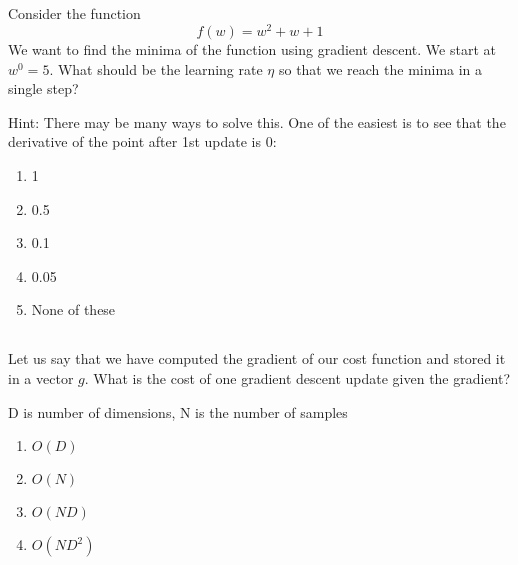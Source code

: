 \begin{frame}
\section{}
Consider the function
\[f(w) = w^2 + w + 1\]
We want to find the minima of the function using gradient descent. We start at $w^0=5$. What should be the learning rate $\eta$ so that we reach the minima in a single step?

Hint: There may be many ways to solve this. One of the easiest is to see that the derivative of the point after 1st update is 0:
\begin{enumerate}
\item 1
\item 0.5       %
\item 0.1
\item 0.05
\item None of these     %
\end{enumerate}
\end{frame}

\begin{frame}
\section{}
Let us say that we have computed the gradient of our cost function and stored it in a vector $g$. What is the cost of one gradient descent update given the gradient?

D is number of dimensions, N is the number of samples
\begin{enumerate}
\item $O(D)$    %
\item $O(N)$
\item $O(ND)$
\item $O(ND^2)$
\end{enumerate}
\end{frame}


